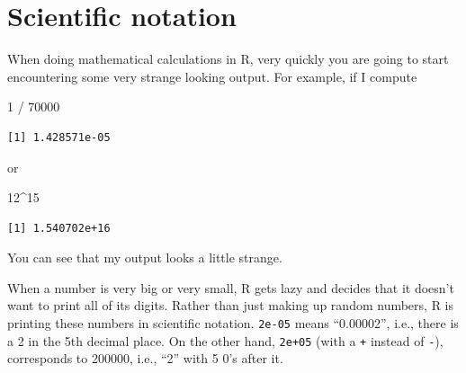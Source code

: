 \documentclass[
  letterpaper,
  DIV=11,
  numbers=noendperiod]{scrreprt}
\newenvironment{Shaded}{\begin{snugshade}}{\end{snugshade}}
\newcommand{\DecValTok}[1]{\textcolor[rgb]{0.68,0.00,0.00}{#1}}
\newcommand{\SpecialCharTok}[1]{\textcolor[rgb]{0.37,0.37,0.37}{#1}}
\begin{document}
\section{Scientific notation}\label{scientific-notation}

When doing mathematical calculations in R, very quickly you are going to
start encountering some very strange looking output. For example, if I
compute

\begin{Shaded}
\begin{Highlighting}[]
\DecValTok{1} \SpecialCharTok{/} \DecValTok{70000}
\end{Highlighting}
\end{Shaded}

\begin{verbatim}
[1] 1.428571e-05
\end{verbatim}

or

\begin{Shaded}
\begin{Highlighting}[]
\DecValTok{12}\SpecialCharTok{\^{}}\DecValTok{15}
\end{Highlighting}
\end{Shaded}

\begin{verbatim}
[1] 1.540702e+16
\end{verbatim}

You can see that my output looks a little strange.

When a number is very big or very small, R gets lazy and decides that it
doesn't want to print all of its digits. Rather than just making up
random numbers, R is printing these numbers in scientific notation.
\texttt{2e-05} means ``0.00002'', i.e., there is a 2 in the 5th decimal
place. On the other hand, \texttt{2e+05} (with a \texttt{+} instead of
\texttt{-}), corresponds to 200000, i.e., ``2'' with 5 0's after it.
\end{document}
